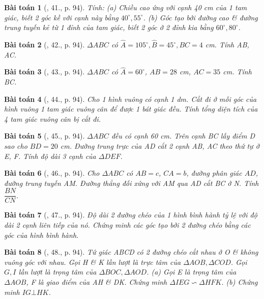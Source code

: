 \documentclass{article}
\newtheorem{baitoan}{Bài toán}
\begin{document}
\begin{baitoan}[\cite{Binh_Toan_9_tap_1}, 41., p. 94]
	Tính: (a) Chiều cao ứng với cạnh {\rm40 cm} của 1 tam giác, biết 2 góc kề với cạnh này bằng $40^\circ,55^\circ$. (b) Góc tạo bởi đường cao \& đường trung tuyến kẻ từ 1 đỉnh của tam giác, biết 2 góc ở 2 đỉnh kia bằng $60^\circ,80^\circ$.
\end{baitoan}

\begin{baitoan}[\cite{Binh_Toan_9_tap_1}, 42., p. 94]
	$\Delta ABC$ có $\widehat{A} = 105^\circ,\widehat{B} = 45^\circ, BC = 4$ {\rm cm}. Tính AB, AC.
\end{baitoan}

\begin{baitoan}[\cite{Binh_Toan_9_tap_1}, 43., p. 94]
	$\Delta ABC$ có $\widehat{A} = 60^\circ$, $AB = 28$ {\rm cm}, $AC = 35$ {\rm cm}. Tính BC.
\end{baitoan}

\begin{baitoan}[\cite{Binh_Toan_9_tap_1}, 44., p. 94]
	Cho 1 hình vuông có cạnh {\rm1 dm}. Cắt đi ở mỗi góc của hình vuông 1 tam giác vuông cân để được 1 bát giác đều. Tính tổng diện tích của 4 tam giác vuông cân bị cắt đi.
\end{baitoan}

\begin{baitoan}[\cite{Binh_Toan_9_tap_1}, 45., p. 94]
	$\Delta ABC$ đều có cạnh {\rm60 cm}. Trên cạnh BC lấy điểm D sao cho $BD = 20$ {\rm cm}. Đường trung trực của AD cắt 2 cạnh AB, AC theo thứ tự ở E, F. Tính độ dài 3 cạnh của $\Delta DEF$.
\end{baitoan}

\begin{baitoan}[\cite{Binh_Toan_9_tap_1}, 46., p. 94]
	Cho $\Delta ABC$ có $AB = c$, $CA = b$, đường phân giác $AD$, đường trung tuyến AM. Đường thẳng đối xứng với AM qua AD cắt BC ở N. Tính $\dfrac{BN}{CN}$.
\end{baitoan}

\begin{baitoan}[\cite{Binh_Toan_9_tap_1}, 47., p. 94]
	Độ dài 2 đường chéo của 1 hình bình hành tỷ lệ với độ dài 2 cạnh liên tiếp của nó. Chứng minh các góc tạo bởi 2 đường chéo bằng các góc của hình bình hành.
\end{baitoan}

\begin{baitoan}[\cite{Binh_Toan_9_tap_1}, 48., p. 94]
	Tứ giác ABCD có 2 đường chéo cắt nhau ở O \& không vuông góc với nhau. Gọi H \& K lần lượt là trực tâm của $\Delta AOB,\Delta COD$. Gọi $G,I$ lần lượt là trọng tâm của $\Delta BOC,\Delta AOD$. (a) Gọi E là trọng tâm của $\Delta AOB$, F là giao điểm của AH \& DK. Chứng minh $\Delta IEG\backsim\Delta HFK$. (b) Chứng minh $IG\bot HK$.
\end{baitoan}
\end{document}
